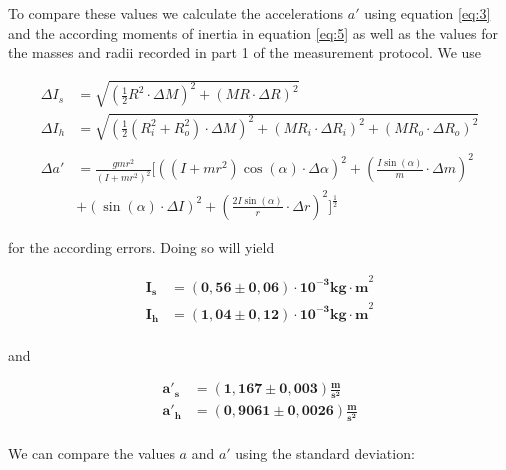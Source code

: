 \documentclass{article}
\begin{document}
\newpage

To compare these values we calculate the accelerations $a'$ using equation \ref{eq:3} and the according moments of inertia in equation \ref{eq:5} as well as the values for the masses and radii recorded in part 1 of the measurement protocol. We use 

\begin{equation}
    \begin{split}
        \Delta I_s &= \sqrt{\left( \frac{1}{2}R^2 \cdot \Delta M \right)^2 + (MR \cdot \Delta R)^2} \\
        \Delta I_h &= \sqrt{\left( \frac{1}{2}(R_i^2 + R_o^2) \cdot \Delta M \right)^2 + (MR_i \cdot \Delta R_i)^2 + (MR_o \cdot \Delta R_o)^2} \\ \\
        \Delta a' &= \frac{gmr^2}{(I+mr^2)^2} \Biggl[ \left( (I+mr^2)\cos{(\alpha)} \cdot \Delta \alpha \right)^2 + \left( \frac{I \sin{(\alpha)}}{m} \cdot \Delta m \right)^2 \\
        &+ \left( \sin{(\alpha)} \cdot \Delta I \right)^2 + \left( \frac{2I \sin{(\alpha)}}{r} \cdot \Delta r \right)^2 \Biggr]^{\frac{1}{2}}        
    \end{split}
    \label{eq:err1}
\end{equation} 

for the according errors. Doing so will yield

\begin{equation}
    \begin{split}
        \bm{I_s} &= \bm{(0,56 \pm 0,06) \cdot 10^{-3} \textbf{kg} \cdot \textbf{m}}^2 \\
        \bm{I_h} &= \bm{(1,04 \pm 0,12) \cdot 10^{-3} \textbf{kg} \cdot \textbf{m}}^2 \\
    \end{split}
\end{equation}

and

\begin{equation}
    \begin{split}
        \bm{a'_s} &= \bm{(1,167 \pm 0,003) \frac{\textbf{m}}{\textbf{s}^2}} \\
        \bm{a'_h} &= \bm{(0,9061 \pm 0,0026) \frac{\textbf{m}}{\textbf{s}^2}} \\
    \end{split}
    \label{res:a'}
\end{equation}

We can compare the values $a$ and $a'$ using the standard deviation:
\end{document}
